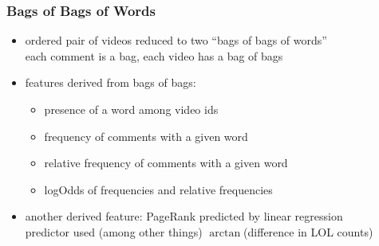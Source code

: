 \documentclass[fleqn]{beamer}
\begin{document}
\begin{frame}
\frametitle{Bags of Bags of Words}
     \begin{itemize}
         \item ordered pair of videos reduced to two ``bags of bags of words''  \\
                  each comment is a bag, each video has a bag of bags

         \item features derived from bags of bags:
             \begin{itemize}
                 \item presence of a word  among video ids 
                 \item frequency of comments with a given word
                 \item relative frequency of comments with a given word
                 \item  logOdds of frequencies and relative frequencies
              \end{itemize}
         
         \item another derived feature: PageRank predicted by linear regression\\ 
                  predictor used (among other things) $\arctan$(difference in LOL counts)
     
     \end{itemize}
\end{frame}
\end{document}
